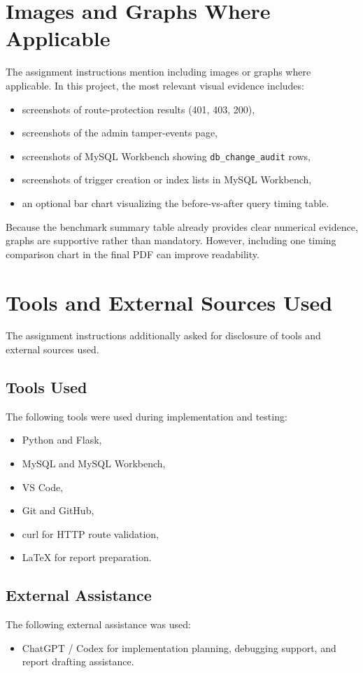 \documentclass[12pt,a4paper]{article}
\begin{document}
\section{Images and Graphs Where Applicable}
The assignment instructions mention including images or graphs where applicable. In this project, the most relevant visual evidence includes:
\begin{itemize}[leftmargin=1.5em]
    \item screenshots of route-protection results (401, 403, 200),
    \item screenshots of the admin tamper-events page,
    \item screenshots of MySQL Workbench showing \texttt{db\_change\_audit} rows,
    \item screenshots of trigger creation or index lists in MySQL Workbench,
    \item an optional bar chart visualizing the before-vs-after query timing table.
\end{itemize}

Because the benchmark summary table already provides clear numerical evidence, graphs are supportive rather than mandatory. However, including one timing comparison chart in the final PDF can improve readability.

\section{Tools and External Sources Used}
The assignment instructions additionally asked for disclosure of tools and external sources used.

\subsection{Tools Used}
The following tools were used during implementation and testing:
\begin{itemize}[leftmargin=1.5em]
    \item Python and Flask,
    \item MySQL and MySQL Workbench,
    \item VS Code,
    \item Git and GitHub,
    \item curl for HTTP route validation,
    \item LaTeX for report preparation.
\end{itemize}

\subsection{External Assistance}
The following external assistance was used:
\begin{itemize}[leftmargin=1.5em]
    \item ChatGPT / Codex for implementation planning, debugging support, and report drafting assistance.
\end{itemize}
\end{document}
